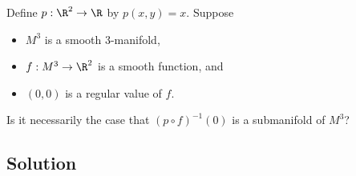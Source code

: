 \documentclass[12pt]{quiz}
\begin{document}
\maketitle

\noindent
Define $p : \R^2 \to \R$ by $p(x,y) = x$.  Suppose 
\begin{itemize}
\item $M^3$ is a smooth 3-manifold,
\item $f : M^3 \to \R^2$ is a smooth function, and
\item $(0,0)$ is a regular value of $f$.
\end{itemize}
Is it necessarily the case that $(p \circ f)^{-1}(0)$ is a submanifold of $M^3$?

\subsection*{Solution}

\pagebreak
\null

\end{document}
